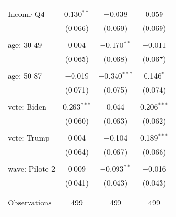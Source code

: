 \begin{tabular}{@{\extracolsep{5pt}}lccc}
  & & & \\ 
 Income Q4 & 0.130$^{**}$ & $-$0.038 & 0.059 \\ 
  & (0.066) & (0.069) & (0.069) \\ 
  & & & \\ 
 age: 30-49 & 0.004 & $-$0.170$^{**}$ & $-$0.011 \\ 
  & (0.065) & (0.068) & (0.067) \\ 
  & & & \\ 
 age: 50-87 & $-$0.019 & $-$0.340$^{***}$ & 0.146$^{*}$ \\ 
  & (0.071) & (0.075) & (0.074) \\ 
  & & & \\ 
 vote: Biden & 0.263$^{***}$ & 0.044 & 0.206$^{***}$ \\ 
  & (0.060) & (0.063) & (0.062) \\ 
  & & & \\ 
 vote: Trump & 0.004 & $-$0.104 & 0.189$^{***}$ \\ 
  & (0.064) & (0.067) & (0.066) \\ 
  & & & \\ 
 wave: Pilote 2 & 0.009 & $-$0.093$^{**}$ & $-$0.016 \\ 
  & (0.041) & (0.043) & (0.043) \\ 
  & & & \\ 
\hline \\[-1.8ex] 

Observations & 499 & 499 & 499 \\ 
\hline 
\hline \\[-1.8ex] 
\end{tabular} 